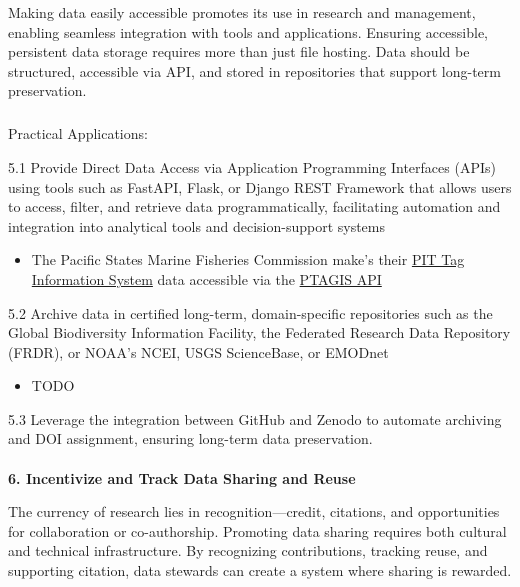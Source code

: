 \documentclass[
  letterpaper,
  DIV=11,
  numbers=noendperiod]{scrartcl}
\makeatletter
\let\oldparagraph\paragraph
\renewcommand{\paragraph}{
    \@ifstar
      \xxxParagraphStar
      \xxxParagraphNoStar
  }
\newcommand{\xxxParagraphStar}[1]{\oldparagraph*{#1}\mbox{}}
\newcommand{\xxxParagraphNoStar}[1]{\oldparagraph{#1}\mbox{}}
\let\oldsubparagraph\subparagraph
\renewcommand{\subparagraph}{
    \@ifstar
      \xxxSubParagraphStar
      \xxxSubParagraphNoStar
  }
\newcommand{\xxxSubParagraphStar}[1]{\oldsubparagraph*{#1}\mbox{}}
\newcommand{\xxxSubParagraphNoStar}[1]{\oldsubparagraph{#1}\mbox{}}
\providecommand{\tightlist}{%
  \setlength{\itemsep}{0pt}\setlength{\parskip}{0pt}}\usepackage{longtable,booktabs,array}
\makeatother
\begin{document}
Making data easily accessible promotes its use in research and
management, enabling seamless integration with tools and applications.
Ensuring accessible, persistent data storage requires more than just
file hosting. Data should be structured, accessible via API, and stored
in repositories that support long-term preservation.

\subparagraph{Practical Applications:}\label{practical-applications-4}

5.1 Provide Direct Data Access via Application Programming Interfaces
(APIs) using tools such as FastAPI, Flask, or Django REST Framework that
allows users to access, filter, and retrieve data programmatically,
facilitating automation and integration into analytical tools and
decision-support systems

\begin{itemize}
\tightlist
\item
  The Pacific States Marine Fisheries Commission make's their
  \href{https://www.psmfc.org/program/pit-tag-information-systems-ptagis}{PIT
  Tag Information System} data accessible via the
  \href{https://api.ptagis.org/index.html\#:~:text=PTAGIS\%20API\%20Gets\%20a\%20list,PTAGIS\%20and\%20currently\%20contributing\%20data}{PTAGIS
  API}
\end{itemize}

5.2 Archive data in certified long-term, domain-specific repositories
such as the Global Biodiversity Information Facility, the Federated
Research Data Repository (FRDR), or NOAA's NCEI, USGS ScienceBase, or
EMODnet

\begin{itemize}
\tightlist
\item
  TODO
\end{itemize}

5.3 Leverage the integration between GitHub and Zenodo to automate
archiving and DOI assignment, ensuring long-term data preservation.

\paragraph{\texorpdfstring{\textbf{6. Incentivize and Track Data Sharing
and
Reuse}}{6. Incentivize and Track Data Sharing and Reuse}}\label{incentivize-and-track-data-sharing-and-reuse}

The currency of research lies in recognition---credit, citations, and
opportunities for collaboration or co-authorship. Promoting data sharing
requires both cultural and technical infrastructure. By recognizing
contributions, tracking reuse, and supporting citation, data stewards
can create a system where sharing is rewarded.
\end{document}
